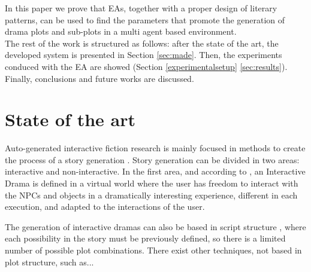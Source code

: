 \documentclass[runningheads]{llncs}
\begin{document}

In this paper we prove that EAs, together with a proper design of literary patterns, can be used to find the parameters that promote the generation of drama plots and sub-plots in a multi agent based environment.\\

The rest of the work is structured as follows: after the state of the art, the developed system is presented in Section \ref{sec:made}. Then, the experiments conduced with the EA are showed (Section \ref{experimentalsetup} \ref{sec:results}). Finally, conclusions and future works are discussed.


\section{State of the art}
\label{sec:soa}


Auto-generated interactive fiction research is mainly focused in methods to create the process of a story generation \cite{nairat2011character}. Story generation can be divided in two areas: interactive and non-interactive. In the first area, and according to \cite{ReviewArinbjarnar09}, an Interactive Drama is defined in a virtual world where the user has freedom to interact with the NPCs and objects in a dramatically interesting experience, different in each execution, and adapted to the interactions of the user.



The generation of interactive dramas can also be based in script
structure \cite{ArchitectureYoung04}, where each possibility in the
story must be previously defined, so there is a limited number of
possible plot combinations. There exist other techniques, not based in
plot structure, such as... 

\end{document}
